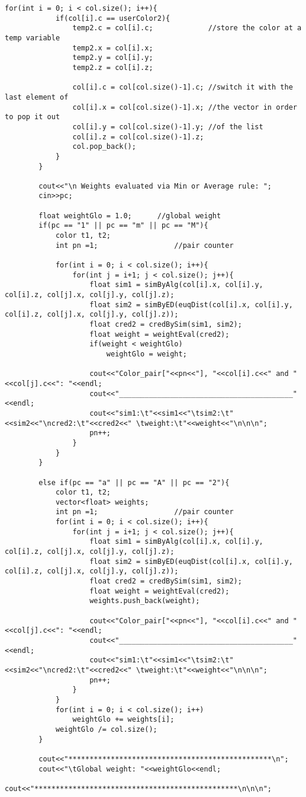 \documentclass[egilmezThesis.tex]{subfiles}
\begin{document}
\begin{lstlisting}[caption=The C++ implementation of the application concerning colors, breaklines=true]
		for(int i = 0; i < col.size(); i++){
			if(col[i].c == userColor2){
				temp2.c = col[i].c;				//store the color at a temp variable
				temp2.x = col[i].x;
				temp2.y = col[i].y;
				temp2.z = col[i].z;

				col[i].c = col[col.size()-1].c;	//switch it with the last element of
				col[i].x = col[col.size()-1].x;	//the vector in order to pop it out
				col[i].y = col[col.size()-1].y;	//of the list
				col[i].z = col[col.size()-1].z;
				col.pop_back();
			}
		}

		cout<<"\n Weights evaluated via Min or Average rule: ";
		cin>>pc;

		float weightGlo = 1.0;		//global weight
		if(pc == "1" || pc == "m" || pc == "M"){
			color t1, t2;
			int pn =1;					//pair counter

			for(int i = 0; i < col.size(); i++){
				for(int j = i+1; j < col.size(); j++){
					float sim1 = simByAlg(col[i].x, col[i].y, col[i].z, col[j].x, col[j].y, col[j].z);
					float sim2 = simByED(euqDist(col[i].x, col[i].y, col[i].z, col[j].x, col[j].y, col[j].z));
					float cred2 = credBySim(sim1, sim2);
					float weight = weightEval(cred2);
					if(weight < weightGlo)
						weightGlo = weight;

					cout<<"Color_pair["<<pn<<"], "<<col[i].c<<" and "<<col[j].c<<": "<<endl;
					cout<<"_________________________________________"<<endl;
					cout<<"sim1:\t"<<sim1<<"\tsim2:\t"<<sim2<<"\ncred2:\t"<<cred2<<" \tweight:\t"<<weight<<"\n\n\n";
					pn++;
				}
			}
		}

		else if(pc == "a" || pc == "A" || pc == "2"){
			color t1, t2;
			vector<float> weights;
			int pn =1;					//pair counter
			for(int i = 0; i < col.size(); i++){
				for(int j = i+1; j < col.size(); j++){
					float sim1 = simByAlg(col[i].x, col[i].y, col[i].z, col[j].x, col[j].y, col[j].z);
					float sim2 = simByED(euqDist(col[i].x, col[i].y, col[i].z, col[j].x, col[j].y, col[j].z));
					float cred2 = credBySim(sim1, sim2);
					float weight = weightEval(cred2);
					weights.push_back(weight);

					cout<<"Color_pair["<<pn<<"], "<<col[i].c<<" and "<<col[j].c<<": "<<endl;
					cout<<"_________________________________________"<<endl;
					cout<<"sim1:\t"<<sim1<<"\tsim2:\t"<<sim2<<"\ncred2:\t"<<cred2<<" \tweight:\t"<<weight<<"\n\n\n";
					pn++;
				}
			}
			for(int i = 0; i < col.size(); i++)
				weightGlo += weights[i];
			weightGlo /= col.size();
		}

		cout<<"************************************************\n";
		cout<<"\tGlobal weight: "<<weightGlo<<endl;
		cout<<"************************************************\n\n\n";


\end{lstlisting}
\end{document}
